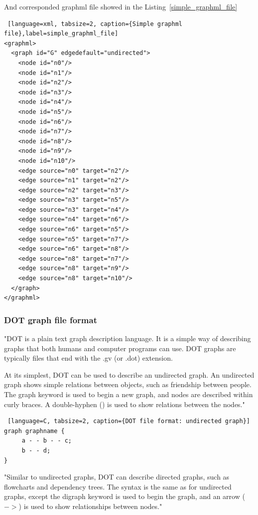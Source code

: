 \documentclass[a4paper,oneside]{article}
\begin{document}
And corresponded graphml file showed in the Listing~\ref{simple_graphml_file}

\begin{center}
\begin{lstlisting} [language=xml, tabsize=2, caption={Simple graphml file},label=simple_graphml_file]
<graphml>
  <graph id="G" edgedefault="undirected">
    <node id="n0"/>
    <node id="n1"/>
    <node id="n2"/>
    <node id="n3"/>
    <node id="n4"/>
    <node id="n5"/>
    <node id="n6"/>
    <node id="n7"/>
    <node id="n8"/>
    <node id="n9"/>
    <node id="n10"/>
    <edge source="n0" target="n2"/>
    <edge source="n1" target="n2"/>
    <edge source="n2" target="n3"/>
    <edge source="n3" target="n5"/>
    <edge source="n3" target="n4"/>
    <edge source="n4" target="n6"/>
    <edge source="n6" target="n5"/>
    <edge source="n5" target="n7"/>
    <edge source="n6" target="n8"/>
    <edge source="n8" target="n7"/>
    <edge source="n8" target="n9"/>
    <edge source="n8" target="n10"/>
  </graph>
</graphml>
\end{lstlisting}
\end{center}

\subsubsection{DOT graph file format}
"DOT is a plain text graph description language. It is a simple way of describing graphs that both humans and computer programs can use. DOT graphs are typically files that end with the .gv (or .dot) extension.


At its simplest, DOT can be used to describe an undirected graph. An undirected graph shows simple relations between objects, such as friendship between people. The graph keyword is used to begin a new graph, and nodes are described within curly braces. A double-hyphen (\textendash \textendash) is used to show relations between the nodes."~\cite{DOT}

\begin{center}
\begin{lstlisting} [language=C, tabsize=2, caption={DOT file format: undirected graph}]
graph graphname {
     a - - b - - c;
     b - - d;
}
\end{lstlisting}
\end{center}

"Similar to undirected graphs, DOT can describe directed graphs, such as flowcharts and dependency trees. The syntax is the same as for undirected graphs, except the digraph keyword is used to begin the graph, and an arrow ($->$) is used to show relationships between nodes."~\cite{DOT}
\end{document}
